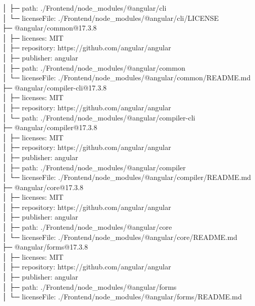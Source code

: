 \documentclass[
    paper=a4,
    twoside=false,
    parskip=half,
    listof=entryprefix,
    listof=totoc,
    index=totoc,
    bibliography=totoc,
    headsepline,
]{scrbook}
\begin{document}
    │  ├─ path: ./Frontend/node\_modules/@angular/cli\\
    │  └─ licenseFile: ./Frontend/node\_modules/@angular/cli/LICENSE\\
    ├─ @angular/common@17.3.8\\
    │  ├─ licenses: MIT\\
    │  ├─ repository: https://github.com/angular/angular\\
    │  ├─ publisher: angular\\
    │  ├─ path: ./Frontend/node\_modules/@angular/common\\
    │  └─ licenseFile: ./Frontend/node\_modules/@angular/common/README.md\\
    ├─ @angular/compiler-cli@17.3.8\\
    │  ├─ licenses: MIT\\
    │  ├─ repository: https://github.com/angular/angular\\
    │  └─ path: ./Frontend/node\_modules/@angular/compiler-cli\\
    ├─ @angular/compiler@17.3.8\\
    │  ├─ licenses: MIT\\
    │  ├─ repository: https://github.com/angular/angular\\
    │  ├─ publisher: angular\\
    │  ├─ path: ./Frontend/node\_modules/@angular/compiler\\
    │  └─ licenseFile: ./Frontend/node\_modules/@angular/compiler/README.md\\
    ├─ @angular/core@17.3.8\\
    │  ├─ licenses: MIT\\
    │  ├─ repository: https://github.com/angular/angular\\
    │  ├─ publisher: angular\\
    │  ├─ path: ./Frontend/node\_modules/@angular/core\\
    │  └─ licenseFile: ./Frontend/node\_modules/@angular/core/README.md\\
    ├─ @angular/forms@17.3.8\\
    │  ├─ licenses: MIT\\
    │  ├─ repository: https://github.com/angular/angular\\
    │  ├─ publisher: angular\\
    │  ├─ path: ./Frontend/node\_modules/@angular/forms\\
    │  └─ licenseFile: ./Frontend/node\_modules/@angular/forms/README.md\\
\end{document}
